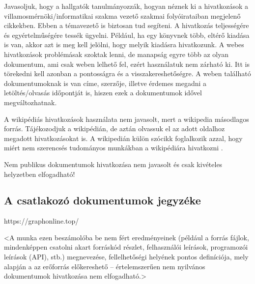 \documentclass[a4paper,oneside]{article}
\begin{document}
Javasoljuk, hogy a hallgatók tanulmányozzák, hogyan néznek ki a
hivatkozások a villamosmérnöki/informatikai szakma vezető szakmai
folyóirataiban megjelenő cikkekben.  Ebben a témavezető is biztosan
tud segíteni.  A hivatkozás teljességére és egyértelműségére tessék
ügyelni.  Például, ha egy könyvnek több, eltérő kiadása is van, akkor
azt is meg kell jelölni, hogy melyik kiadásra hivatkozunk.  A webes
hivatkozások problémásak szoktak lenni, de manapság egyre több az
olyan dokumentum, ami csak weben lelhető fel, ezért használatuk nem
zárható ki. Itt is törekedni kell azonban a pontosságra és a
visszakereshetőségre. A weben található dokumentumoknak is van címe,
szerzője, illetve érdemes megadni a letöltés/olvasás időpontját is,
hiszen ezek a dokumentumok idővel megváltozhatnak.

A wikipédiás hivatkozások használata nem javasolt, mert a wikipedia
másodlagos forrás.  Tájékozodjuk a wikipédián, de aztán olvassuk el az
adott oldalhoz megadott hivatkozásokat is.  A wikipedián külön szócikk
foglalkozik azzal, hogy miért nem szerencsés tudományos munkákban a
wikipédiára hivatkozni \cite{wikipedia}.

Nem publikus dokumentumok hivatkozása nem javasolt és csak kivételes
helyzetben elfogadható!

\subsection{A csatlakozó dokumentumok jegyzéke}
\label{sec:csat-irod}

https://graphonline.top/

<A munka ezen beszámolóba be nem fért eredményeinek (például a forrás
fájlok, mindenképpen csatolni akart forráskód részlet, felhasználói
leírások, programozói leírások (API), stb.) megnevezése,
fellelhetőségi helyének pontos definíciója, mely alapján a az
erőforrás előkereshető -- értelemszerűen nem nyilvános dokumentumok
hivatkozása nem elfogadható.>
\end{document}

